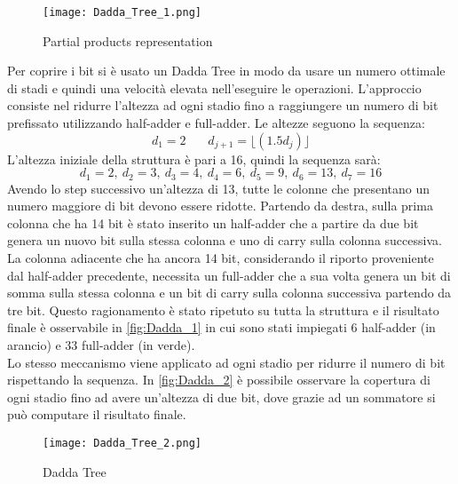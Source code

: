 \begin{figure}[htb]
	\center
	\texttt{[image: Dadda\_Tree\_1.png]}
	\caption{Partial products representation}
	\label{fig:Dadda_1}
\end{figure}
Per coprire i bit si è usato un Dadda Tree in modo da usare un numero ottimale di stadi e quindi una velocità elevata nell'eseguire le operazioni. L'approccio consiste nel ridurre l'altezza ad ogni stadio fino a raggiungere un numero di bit prefissato utilizzando half-adder e full-adder. Le altezze seguono la sequenza:
$$
d_1 = 2 \ \ \ \ \ \ \ \ d_{j+1} = \lfloor(1.5d_j)\rfloor
$$
L'altezza iniziale della struttura è pari a 16, quindi la sequenza sarà:
$$
d_1 = 2,\ d_2 = 3,\ d_3 = 4,\ 
d_4 = 6,\ d_5 = 9,\ d_6 = 13,\ d_7 = 16
$$
Avendo lo step successivo un'altezza di 13, tutte le colonne che presentano un numero maggiore di bit devono essere ridotte. Partendo da destra, sulla prima colonna che ha 14 bit è stato inserito un half-adder che a partire da due bit genera un nuovo bit sulla stessa colonna e uno di carry sulla colonna successiva. La colonna adiacente che ha ancora 14 bit, considerando il riporto proveniente dal half-adder precedente, necessita un full-adder che a sua volta genera un bit di somma sulla stessa colonna e un bit di carry sulla colonna successiva partendo da tre bit. Questo ragionamento è stato ripetuto su tutta la struttura e il risultato finale è osservabile in \autoref{fig:Dadda_1} in cui sono stati impiegati 6 half-adder (in arancio) e 33 full-adder (in verde).\\
Lo stesso meccanismo viene applicato ad ogni stadio per ridurre il numero di bit rispettando la sequenza. In \autoref{fig:Dadda_2} è possibile osservare la copertura di ogni stadio fino ad avere un'altezza di due bit, dove grazie ad un sommatore si può computare il risultato finale. 

\begin{figure}[htb]
	\center
	\texttt{[image: Dadda\_Tree\_2.png]}
	\caption{Dadda Tree }
	\label{fig:Dadda_2}
\end{figure}

